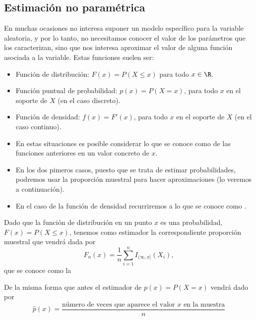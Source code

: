 \subsection{Estimación no paramétrica}
\begin{tcolorbox}[colback=blue!5!white, colframe=blue!75!black, title=\textbf{Estimación de funciones asociadas a una variable aleatoria}]
En muchas ocasiones no interesa suponer un modelo específico para la variable aleatoria, y por lo tanto, no necesitamos conocer el valor de los parámetros que los caracterizan, sino que nos interesa aproximar el valor de alguna función asociada a la variable. Estas funciones suelen ser:
\begin{itemize}[label=\textbullet]
    \item Función de distribución: $F(x)=P(X\le x)$ para todo $x\in \R$.
    \item Función puntual de probabilidad: $p(x)=P(X=x)$, para todo $x$ en el soporte de $X$ (en el caso discreto).
    \item Función de densidad:  $f(x)=F'(x)$, para todo  $x$ en el soporte de $X$ (en el caso continuo).
    \item En estas situaciones es posible considerar lo que se conoce como   de las funciones anteriores en un valor concreto de $x$.
    \item En los dos pimeros casos, puesto que se trata de estimar probabilidades, podremos usar la proporción muestral para hacer aproximaciones (lo veremos a continuación).
    \item En el caso de la función de densidad recurriremos a lo que se conoce como  . 
\end{itemize}
\end{tcolorbox}
\begin{tcolorbox}[colback=blue!5!white, colframe=blue!75!black, title=\textbf{Estimación de la función de distribución}]
Dado que la función de distribución en un punto $x$ es una probabilidad, $F(x)=P(X\le x)$, tenemos como estimador la correspondiente proporción muestral que vendrá dada por \[
    F_n(x)=\dfrac{1}{n}\sum_{i=1}^{n} I_{(\infty,x]}(X_i),
\] que se conoce como la  
\end{tcolorbox}
\begin{tcolorbox}[colback=blue!5!white, colframe=blue!75!black, title=\textbf{Estimación de la función puntual de probabilidad}]
De la misma forma que antes el estimador de $p(x)=P(X=x)$ vendrá dado por  \[
    \hat{p}(x)=\dfrac{\text{número de veces que aparece el valor $x$ en la muestra}}{n}
\] 
\end{tcolorbox}
